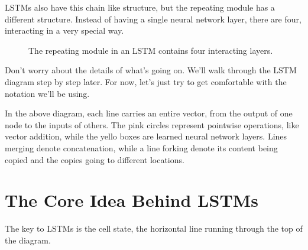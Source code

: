 \documentclass[12pt]{article} %
\begin{document}
LSTMs also have this chain like structure, but the repeating module has a different structure. Instead of having a single neural network layer, there are four, interacting in a very special way.

\begin{figure}[H] %
\caption{The repeating module in an LSTM contains four interacting layers.}
\label{fig:rnnunrolled}
\end{figure}

Don't worry about the details of what's going on. We'll walk through the LSTM diagram step by step later. For now, let's just try to get comfortable with the notation we'll be using.
\begin{figure}[H] %
\label{fig:rnnunrolled}
\end{figure}

In the above diagram, each line carries an entire vector, from the output of one node to the inputs of others. The pink circles represent pointwise operations, like vector addition, while the yello boxes are learned neural network layers. Lines merging denote concatenation, while a line forking denote its content being copied and the copies going to different locations.

\section{The Core Idea Behind LSTMs}

The key to LSTMs is the cell state, the horizontal line running through the top of the diagram.
\end{document}

